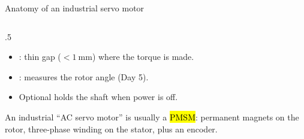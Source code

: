 \documentclass[aspectratio=169,10pt]{beamer}
\begin{document}
\begin{frame}{Anatomy of an industrial servo motor}
\begin{columns}[T]
\begin{column}{.5\textwidth}
\begin{itemize}
\item {}: thin gap ($<\SI{1}{\milli\metre}$) where the torque is made.
\item {}: measures the rotor angle (Day 5).
\item Optional  holds the shaft when power is off.
\end{itemize}
\begin{notebox}
An industrial ``AC servo motor'' is usually a \hl{PMSM}: permanent magnets on the rotor, three-phase winding on the stator, plus an encoder.
\end{notebox}
\end{column}
\end{columns}
\end{frame}

\end{document}
